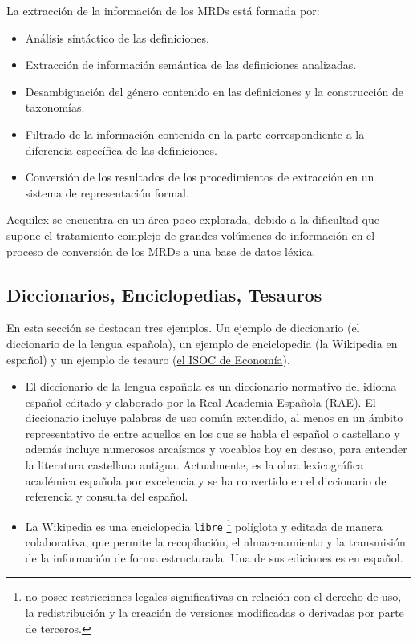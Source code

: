 \documentclass[11pt]{exam}
\begin{document}
\begin{questions}
La extracción de la información de los MRDs está formada por:

\begin{itemize}
	\item Análisis sintáctico de las definiciones.
	\item Extracción de información semántica de las definiciones analizadas.
	\item Desambiguación del género contenido en las definiciones y la construcción de taxonomías.
	\item Filtrado de la información contenida en la parte correspondiente a la diferencia específica de las definiciones.
	\item Conversión de los resultados de los procedimientos de extracción en un sistema de representación formal.
\end{itemize}

Acquilex se encuentra en un área poco explorada, debido a la dificultad que supone el tratamiento complejo de grandes volúmenes de información en el proceso de conversión de los MRDs a una base de datos léxica.

\subsection*{Diccionarios, Enciclopedias, Tesauros}

En esta sección se destacan tres ejemplos. Un ejemplo de diccionario (el diccionario de la lengua española), un ejemplo de enciclopedia (la Wikipedia en español) y un ejemplo de tesauro (\href{https://digital.csic.es/handle/10261/30257}{el ISOC de Economía}).

\begin{itemize}
	\item El diccionario de la lengua española es un diccionario normativo del idioma español editado y elaborado por la Real Academia Española (RAE). El diccionario incluye palabras de uso común extendido, al menos en un ámbito representativo de entre aquellos en los que se habla el español o castellano y además incluye numerosos arcaísmos y vocablos hoy en desuso, para entender la literatura castellana antigua. Actualmente, es la obra lexicográfica académica española por excelencia y se ha convertido en el diccionario de referencia y consulta del español.
	
	\item La Wikipedia es una enciclopedia \texttt{libre} \footnote{no posee restricciones legales significativas en relación con el derecho de uso, la redistribución y la creación de versiones modificadas o derivadas por parte de terceros.} políglota y editada de manera colaborativa, que permite la recopilación, el almacenamiento y la transmisión de la información de forma estructurada. Una de sus ediciones es en español.
	

\end{itemize}
\end{questions}
\end{document}
